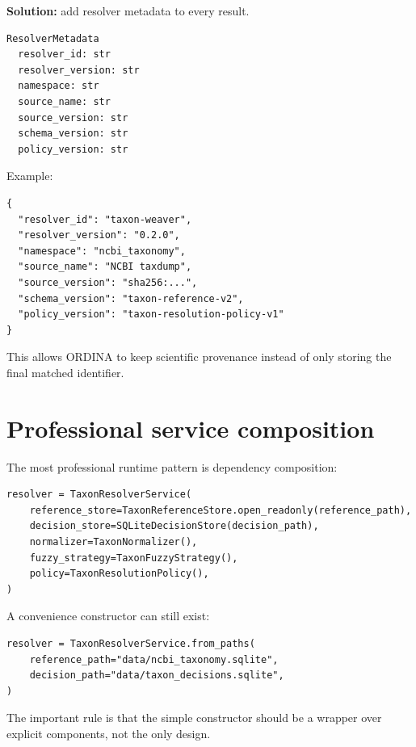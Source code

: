 \documentclass[11pt,a4paper]{article}
\begin{document}
\textbf{Solution:} add resolver metadata to every result.

\begin{Verbatim}[fontsize=\small]
ResolverMetadata
  resolver_id: str
  resolver_version: str
  namespace: str
  source_name: str
  source_version: str
  schema_version: str
  policy_version: str
\end{Verbatim}

Example:

\begin{Verbatim}[fontsize=\small]
{
  "resolver_id": "taxon-weaver",
  "resolver_version": "0.2.0",
  "namespace": "ncbi_taxonomy",
  "source_name": "NCBI taxdump",
  "source_version": "sha256:...",
  "schema_version": "taxon-reference-v2",
  "policy_version": "taxon-resolution-policy-v1"
}
\end{Verbatim}

This allows ORDINA to keep scientific provenance instead of only storing the final matched identifier.

\section{Professional service composition}

The most professional runtime pattern is dependency composition:

\begin{Verbatim}[fontsize=\small]
resolver = TaxonResolverService(
    reference_store=TaxonReferenceStore.open_readonly(reference_path),
    decision_store=SQLiteDecisionStore(decision_path),
    normalizer=TaxonNormalizer(),
    fuzzy_strategy=TaxonFuzzyStrategy(),
    policy=TaxonResolutionPolicy(),
)
\end{Verbatim}

A convenience constructor can still exist:

\begin{Verbatim}[fontsize=\small]
resolver = TaxonResolverService.from_paths(
    reference_path="data/ncbi_taxonomy.sqlite",
    decision_path="data/taxon_decisions.sqlite",
)
\end{Verbatim}

The important rule is that the simple constructor should be a wrapper over explicit components, not the only design.

\end{document}
